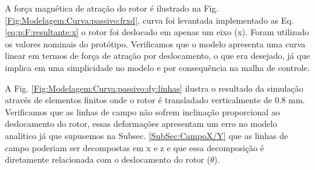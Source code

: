 
A força magnética de atração do rotor é ilustrado na Fig. \ref{Fig:Modelagem:Curva:passivo:frxd}, 
curva foi levantada implementado as Eq. \eqref{eq:p:F:resultante:x}
o rotor foi deslocado em apenas um eixo (x). Foram utilizado os valores nominais do protótipo. Verificamos que o modelo apresenta uma curva linear em termos de força de atração por deslocamento, o que era desejado, já que implica em uma simplicidade no modelo e por consequência na malha de controle.


A Fig. \ref{Fig:Modelagem:Curva:passivo:dy:linhas} ilustra o resultado da simulação através de elementos finitos onde o rotor é transladado verticalmente de 0.8 mm. Verificamos que as linhas de campo não sofrem inclinação proporcional ao deslocamento do rotor, essas deformações apresentam um erro no modelo analítico já que supusemos na Subsec. \ref{SubSec:CampoX/Y} que as linhas de campo poderiam ser decompostas em x e z e que essa decomposição é diretamente relacionada com o deslocamento do rotor ($\theta$). 

